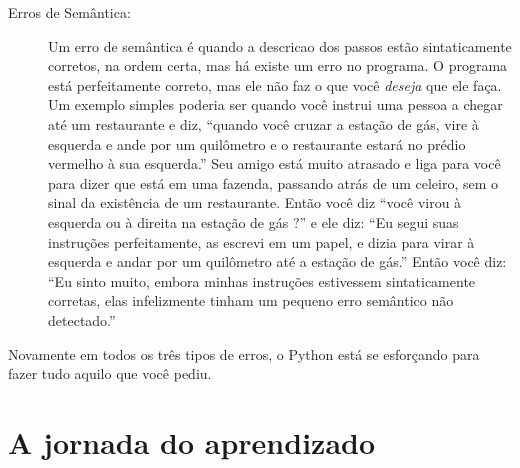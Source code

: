 \begin{description}
\item[Erros de Semântica:] Um erro de semântica é quando a descricao dos passos estão
sintaticamente corretos, na ordem certa, mas há existe um erro no programa. O programa
está perfeitamente correto, mas ele não faz o que você {\em deseja} que ele faça. Um
exemplo simples poderia ser quando você instrui uma pessoa a chegar até um restaurante
e diz, ``quando você cruzar a estação de gás, vire à esquerda e ande por um quilômetro e o
restaurante estará no prédio vermelho à sua esquerda.'' Seu amigo está muito atrasado
e liga para você para dizer que está em uma fazenda, passando atrás de um celeiro, sem o sinal
da existência de um restaurante. Então você diz ``você virou à esquerda ou à direita na
estação de gás ?'' e ele diz: ``Eu segui suas instruções perfeitamente, as escrevi em um papel,
e dizia para virar à esquerda e andar por um quilômetro até a estação de gás.'' Então
você diz: ``Eu sinto muito, embora minhas instruções estivessem sintaticamente corretas,
elas infelizmente tinham um pequeno erro semântico não detectado.''
%

\end{description}
%

Novamente em todos os três tipos de erros, o Python está se esforçando para
fazer tudo aquilo que você pediu.
%

\section{A jornada do aprendizado}
%

